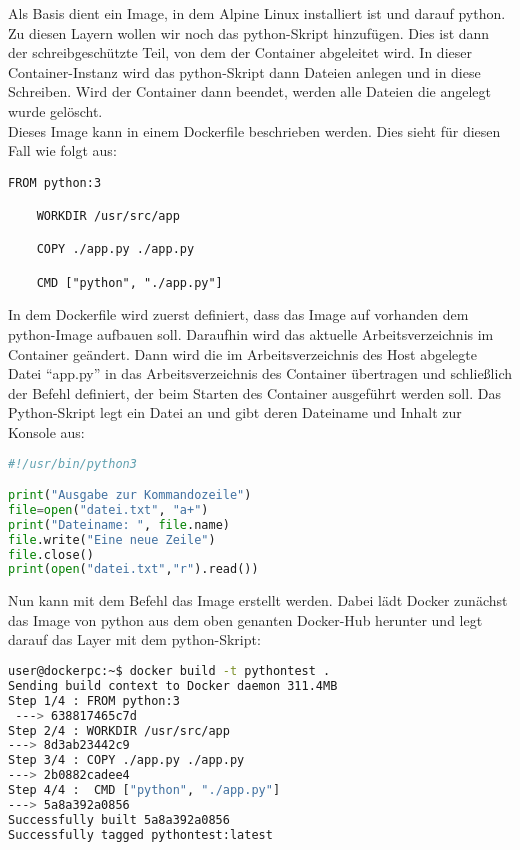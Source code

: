 Als Basis dient ein Image, in dem Alpine Linux installiert ist und darauf python. Zu diesen Layern wollen wir noch das python-Skript hinzufügen. Dies ist dann der schreibgeschützte Teil, von dem der Container abgeleitet wird. In dieser Container-Instanz wird das python-Skript dann Dateien anlegen und in diese Schreiben. Wird der Container dann beendet, werden alle Dateien die angelegt wurde gelöscht.\\
Dieses Image kann in einem Dockerfile beschrieben werden. Dies sieht für diesen Fall wie folgt aus:

\begin{lstlisting}[language=docker,label={code:dockerfile}]
    FROM python:3
    
    WORKDIR /usr/src/app
    
    COPY ./app.py ./app.py
    
    CMD ["python", "./app.py"]
\end{lstlisting}

In dem Dockerfile wird zuerst definiert, dass das Image auf vorhanden dem python-Image aufbauen soll. Daraufhin wird das aktuelle Arbeitsverzeichnis im Container geändert. Dann wird die im Arbeitsverzeichnis des Host abgelegte Datei "`app.py"' in das Arbeitsverzeichnis des Container übertragen und schließlich der Befehl definiert, der beim Starten des Container ausgeführt werden soll. Das Python-Skript legt ein Datei an und gibt deren Dateiname und Inhalt zur Konsole aus:
\begin{lstlisting}[language=python,label={code:pythonapp}]
#!/usr/bin/python3

print("Ausgabe zur Kommandozeile")
file=open("datei.txt", "a+")
print("Dateiname: ", file.name)
file.write("Eine neue Zeile")
file.close()
print(open("datei.txt","r").read())
\end{lstlisting}
Nun kann mit dem Befehl  das Image erstellt werden. Dabei lädt Docker zunächst das Image von python aus dem oben genanten Docker-Hub herunter und legt darauf das Layer mit dem python-Skript:

\begin{lstlisting}[language=bash,label={code:dockerbuild}]
user@dockerpc:~$ docker build -t pythontest .
Sending build context to Docker daemon 311.4MB
Step 1/4 : FROM python:3
 ---> 638817465c7d
Step 2/4 : WORKDIR /usr/src/app
---> 8d3ab23442c9
Step 3/4 : COPY ./app.py ./app.py
---> 2b0882cadee4
Step 4/4 :  CMD ["python", "./app.py"]
---> 5a8a392a0856
Successfully built 5a8a392a0856
Successfully tagged pythontest:latest
\end{lstlisting}

